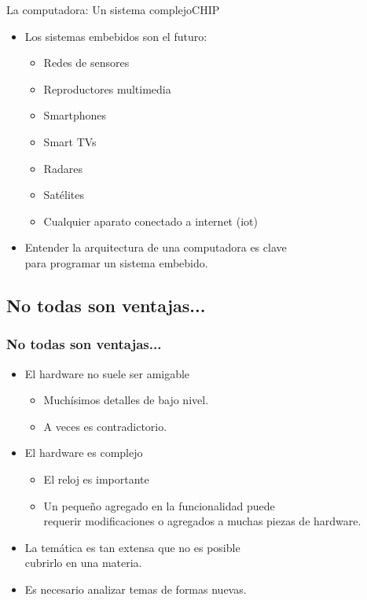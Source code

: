 \documentclass[aspectratio=169,compress]{beamer}
\begin{document}
\begin{frame}{La computadora: Un sistema complejo}{CHIP}
\begin{frame}[fragile]
\begin{small}
\begin{itemize}
\item Los sistemas embebidos son el futuro:
\begin{itemize}
\item Redes de sensores
\item Reproductores multimedia
\item Smartphones
\item Smart TVs
\item Radares
\item Satélites
\item Cualquier aparato conectado a internet (iot)
\end{itemize}

\item Entender la arquitectura de una computadora es clave \\ para programar un sistema embebido.

\end{itemize}
\end{small}

\end{frame}




\subsection{No todas son ventajas...}

\begin{frame}[fragile]
  \frametitle{No todas son ventajas...}

\begin{small}
\begin{itemize}

\item El hardware no suele ser amigable

\begin{itemize}
\item Muchísimos detalles de bajo nivel.
\item A veces es contradictorio.
\end{itemize}

\item El hardware es complejo
\begin{itemize}
\item  El reloj es importante
\item Un pequeño agregado en la funcionalidad puede \\
requerir modificaciones o agregados a muchas piezas de hardware.
\end{itemize}
\item La temática es tan extensa que no es posible \\
cubrirlo en una materia.
\item Es necesario analizar temas de formas nuevas.


\end{itemize}
\end{small}
\end{frame}
\end{frame}
\end{document}
